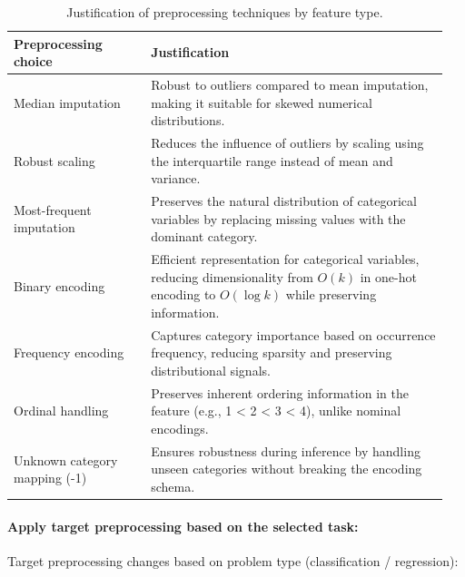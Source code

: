 \begin{table}[!htbp]
\centering
\small
\renewcommand{\arraystretch}{1.15}
\setlength{\tabcolsep}{4pt}
\caption{Justification of preprocessing techniques by feature type.}
\begin{tabular}{p{0.30\linewidth}p{0.65\linewidth}}
\toprule
\textbf{Preprocessing choice} & \textbf{Justification} \\
\midrule

Median imputation &
Robust to outliers compared to mean imputation, making it suitable for skewed numerical distributions. \\

Robust scaling &
Reduces the influence of outliers by scaling using the interquartile range instead of mean and variance. \\

Most-frequent imputation &
Preserves the natural distribution of categorical variables by replacing missing values with the dominant category. \\

Binary encoding &
Efficient representation for categorical variables, reducing dimensionality from $O(k)$ in one-hot encoding to $O(\log k)$ while preserving information. \\

Frequency encoding &
Captures category importance based on occurrence frequency, reducing sparsity and preserving distributional signals. \\

Ordinal handling &
Preserves inherent ordering information in the feature (e.g., 1 < 2 < 3 < 4), unlike nominal encodings. \\

Unknown category mapping (-1) &
Ensures robustness during inference by handling unseen categories without breaking the encoding schema. \\

\bottomrule
\end{tabular}
\end{table}
\paragraph{Apply target preprocessing based on the selected task:}\par
Target preprocessing changes based on problem type (classification / regression):

